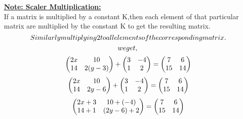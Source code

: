 \documentclass[a4paper,12pt]{article}
\begin{document}
	\\$$$$\\
	\textbf{\underline{Note: Scaler Multiplication:}}\\
	If a matrix is multiplied by a constant K,then each element of that particular matrix are multiplied by the constant K to get the resulting matrix.\\$$\\
	
	Similarly multiplying 2 to all elements of the corresponding matrix.\\$$$$\\
	we get,\\$$$$\\
	\begin{pmatrix}
		 2x & 10\\
		 14 & 2(y-3)\\
	\end{pmatrix}
	+
	\begin{pmatrix}
		3 & -4\\
	    1 & 2\\
	\end{pmatrix}=
	\begin{pmatrix}
		7 & 6\\
	    15 & 14\\
	\end{pmatrix}\\$$$$\\
     	\begin{pmatrix}
		 2x & 10\\
		 14 & 2y-6\\
	\end{pmatrix}
	+
	\begin{pmatrix}
		3 & -4\\
	    1 & 2\\
	\end{pmatrix}=
	\begin{pmatrix}
		7 & 6\\
	    15 & 14\\
	\end{pmatrix}\\$$$$\\
		\begin{pmatrix}
		 2x+3 & 10+(-4)\\
		 14+1 & (2y-6)+2\\
	\end{pmatrix}
	=
	\begin{pmatrix}
		7 & 6\\
	    15 & 14\\
	\end{pmatrix}\\$$$$\\
\end{document}
